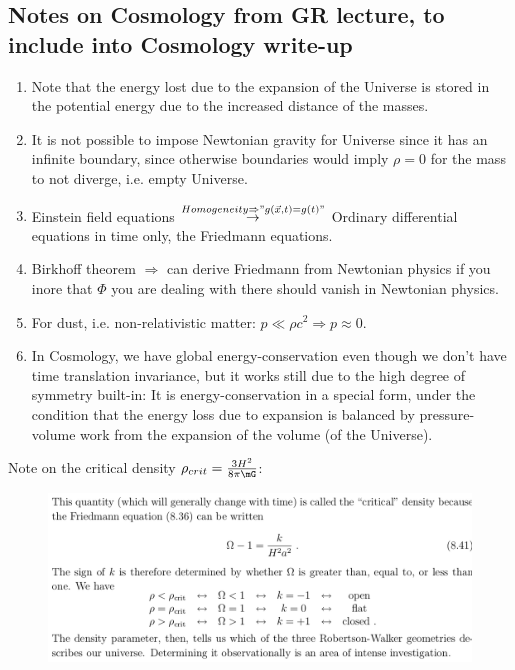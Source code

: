 	\subsection{Notes on Cosmology from GR lecture, to include into Cosmology write-up}
	\begin{enumerate}
		\item Note that the energy lost due to the expansion of the Universe is stored in the potential energy due to the increased distance of the masses.
		\item It is not possible  to impose Newtonian gravity for Universe since it has an infinite boundary, since otherwise boundaries would imply $\rho = 0$ for the mass to not diverge, i.e. empty Universe.
		\item Einstein field equations $\stackrel{Homogeneity\Rightarrow"g(\vec{x},t)=g(t)"}{\rightarrow}$ Ordinary differential equations in time only, the Friedmann equations.
		\item Birkhoff theorem $\Rightarrow$ can derive Friedmann from Newtonian physics if you inore that $\Phi$ you are dealing with there should vanish in Newtonian physics.
		\item For dust, i.e. non-relativistic matter: $p \ll \rho c^2 \Rightarrow p \approx 0$.
		\item In Cosmology, we have global energy-conservation even though we don't have time translation invariance, but it works still due to the high degree of symmetry built-in: It is energy-conservation in a special form, under the condition that the energy loss due to expansion is balanced by pressure-volume work from the expansion of the volume (of the Universe).
	\end{enumerate}
Note on the critical density $\rho_{crit}=\frac{3H^2}{8\pi \mG}$:
\begin{figure}[h!]
	\centering
	\includegraphics[width=0.7\linewidth]{gfx/criticaldensityCosomology}
	\caption{}
	\label{fig:criticaldensitycosomology}
\end{figure}

